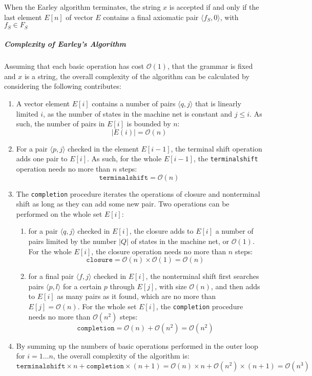 \documentclass[english]{article}
\begin{document}
\bigskip
\begin{property}
  When the Earley algorithm terminates, the string \(x\) is accepted if and only if the last element \(E[n]\) of vector \(E\) contains a final axiomatic pair \(\langle f_S, 0 \rangle\), with \(f_S \in F_S\)
\end{property}

\subparagraph*{Complexity of Earley's Algorithm}
Assuming that each basic operation has cost \(\mathcal{O}(1)\), that the grammar is fixed and \(x\) is a string, the overall complexity of the algorithm can be calculated by considering the following contributes:

\begin{enumerate}
  \item A vector element \(E[i]\) contains a number of pairs \(\langle q, j \rangle\) that is linearly limited \(i\), as the number of states in the machine net is constant and \(j \leq i\). As such, the number of pairs in \(E[i]\) is bounded by \(n\): \[ |E(i)| = \mathcal{O}(n) \]
  \item For a pair \(\langle p, j \rangle\) checked in the element \(E[i-1]\), the terminal shift operation adds one pair to \(E[i]\). As such, for the whole \(E[i-1]\), the \texttt{terminalshift} operation needs no more than \(n\) steps: \[ \texttt{terminalshift} = \mathcal{O}(n) \]
  \item The \texttt{completion} procedure iterates the operations of closure and nonterminal shift as long as they can add some new pair. Two operations can be performed on the whole set \(E[i]\):
        \begin{enumerate}[label=\alph*.]
          \item for a pair \(\langle q, j\rangle\) checked in \(E[i]\), the closure adds to \(E[i]\) a number of pairs limited by the number \(|Q|\) of states in the machine net, or \(\mathcal{O}(1)\). For the whole \(E[i]\), the closure operation needs no more than \(n\) steps: \[ \texttt{closure} = \mathcal{O}(n) \times \mathcal{O}(1) = \mathcal{O}(n) \]
          \item for a final pair \(\langle f, j \rangle\) checked in \(E[i]\), the nonterminal shift first searches pairs \(\langle p, l\rangle\) for a certain \(p\) through \(E[j]\), with size \(\mathcal{O}(n)\), and then adds to \(E[i]\) as many pairs as it found, which are no more than \(E[j] = \mathcal{O}(n)\). For the whole set \(E[i]\), the \texttt{completion} procedure needs no more than \(\mathcal{O}(n^2)\) steps: \[ \texttt{completion} = \mathcal{O}(n) + \mathcal{O}(n^2) = \mathcal{O}(n^2) \]
        \end{enumerate}
  \item By summing up the numbers of basic operations performed in the outer loop for \(i = 1 \dots n\), the overall complexity of the algorithm is: \[ \texttt{terminalshift} \times n + \texttt{completion} \times (n+1) = \mathcal{O}(n) \times n + \mathcal{O}(n^2) \times (n + 1) = \mathcal{O}(n^3) \]
\end{enumerate}
\end{document}
